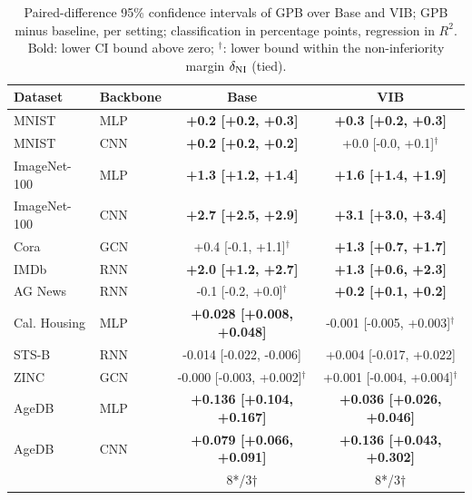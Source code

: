 \begin{table}[t]
\centering
\caption{Paired-difference 95\% confidence intervals of GPB over Base and VIB; GPB minus baseline, per setting; classification in percentage points, regression in $R^2$. Bold: lower CI bound above zero; $^{\dagger}$: lower bound within the non-inferiority margin $\delta_{\rm NI}$ (tied).}
\label{tab:main_result_ci_baselines}
\small
{
\setlength{\tabcolsep}{0.5pt}
\begin{tabular}{llcc}
\hline
Dataset & Backbone & Base & VIB \\
\hline
MNIST & MLP & \textbf{+0.2 [+0.2, +0.3]} & \textbf{+0.3 [+0.2, +0.3]} \\
MNIST & CNN & \textbf{+0.2 [+0.2, +0.2]} & +0.0 [-0.0, +0.1]$^{\dagger}$ \\
ImageNet-100 & MLP & \textbf{+1.3 [+1.2, +1.4]} & \textbf{+1.6 [+1.4, +1.9]} \\
ImageNet-100 & CNN & \textbf{+2.7 [+2.5, +2.9]} & \textbf{+3.1 [+3.0, +3.4]} \\
Cora & GCN & +0.4 [-0.1, +1.1]$^{\dagger}$ & \textbf{+1.3 [+0.7, +1.7]} \\
IMDb & RNN & \textbf{+2.0 [+1.2, +2.7]} & \textbf{+1.3 [+0.6, +2.3]} \\
AG News & RNN & -0.1 [-0.2, +0.0]$^{\dagger}$ & \textbf{+0.2 [+0.1, +0.2]} \\
\hline\hline
Cal. Housing & MLP & \textbf{+0.028 [+0.008, +0.048]} & -0.001 [-0.005, +0.003]$^{\dagger}$ \\
STS-B & RNN & -0.014 [-0.022, -0.006] & +0.004 [-0.017, +0.022] \\
ZINC & GCN & -0.000 [-0.003, +0.002]$^{\dagger}$ & +0.001 [-0.004, +0.004]$^{\dagger}$ \\
AgeDB & MLP & \textbf{+0.136 [+0.104, +0.167]} & \textbf{+0.036 [+0.026, +0.046]} \\
AgeDB & CNN & \textbf{+0.079 [+0.066, +0.091]} & \textbf{+0.136 [+0.043, +0.302]} \\
\hline
 &  & 8*/3† & 8*/3† \\
\hline
\end{tabular}
}
\end{table}
